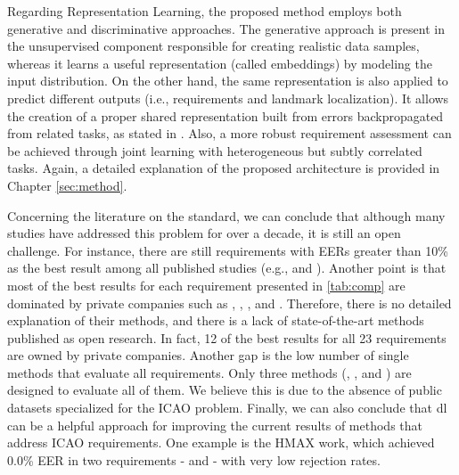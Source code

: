 Regarding Representation Learning, the proposed method employs both generative and discriminative approaches. The generative approach is present in the unsupervised component responsible for creating realistic data samples, whereas it learns a useful representation (called embeddings) by modeling the input distribution. On the other hand, the same representation is also applied to predict different outputs (i.e., requirements and landmark localization). It allows the creation of a proper shared representation built from errors backpropagated from related tasks, as stated in \citep{zhang2014facial}. Also, a more robust requirement assessment can be achieved through joint learning with heterogeneous but subtly correlated tasks. Again, a detailed explanation of the proposed architecture is provided in Chapter \ref{sec:method}.
 
Concerning the literature on the \icao standard, we can conclude that although many studies have addressed this problem for over a decade, it is still an open challenge. For instance, there are still requirements with EERs greater than 10\% as the best result among all published studies (e.g., \lookingaway and \hairacrosseyes). Another point is that most of the best results for each requirement presented in \autoref{tab:comp} are dominated by private companies such as \cite{biometrika}, \cite{id3}, \cite{seamfix}, and \cite{vsoft}. Therefore, there is no detailed explanation of their methods, and there is a lack of state-of-the-art methods published as open research. In fact, 12 of the best results for all 23 requirements are owned by private companies. Another gap is the low number of single methods that evaluate all requirements. Only three methods (\biolab, \biotest, and \biopass) are designed to evaluate all of them. We believe this is due to the absence of public datasets specialized for the ICAO problem. Finally, we can also conclude that \acl{dl} can be a helpful approach for improving the current results of methods that address ICAO requirements. One example is the HMAX work, which achieved 0.0\% EER in two requirements - \framestooheavy and \framecoveringeyes - with very low rejection rates.
 